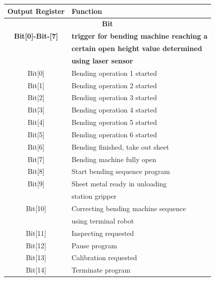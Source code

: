 \begin{table}[h!]
  \centering
  \small
  \renewcommand{\arraystretch}{1.2} %
  \begin{tabular}{c@{\hskip 2cm}l}
    \hline
      \textbf{Output Register} & \textbf{Function} \\ \hline
      \multicolumn{2}{c}{\textbf{Bit}} \\ \hline
      \textbf{Bit[0]-Bit-[7]} & \textbf{trigger for bending machine reaching a}\\
      & \textbf{certain open height value determined}\\
      & \textbf{using laser sensor} \\
      Bit[0] & Bending operation 1 started\\
      Bit[1] & Bending operation 2 started\\
      Bit[2] & Bending operation 3 started\\
      Bit[3] & Bending operation 4 started\\
      Bit[4] & Bending operation 5 started\\
      Bit[5] & Bending operation 6 started\\
      Bit[6] & Bending finished, take out sheet\\
      Bit[7] & Bending machine fully open\\
      Bit[8] & Start bending sequence program\\
      Bit[9] & Sheet metal ready in unloading\\
      & station gripper\\
      Bit[10] & Correcting bending machine sequence\\
      & using terminal robot\\
      Bit[11] & Inspecting requested\\
      Bit[12] & Pause program\\
      Bit[13] & Calibration requested\\
      Bit[14] & Terminate program\\

\end{tabular}
\end{table}
